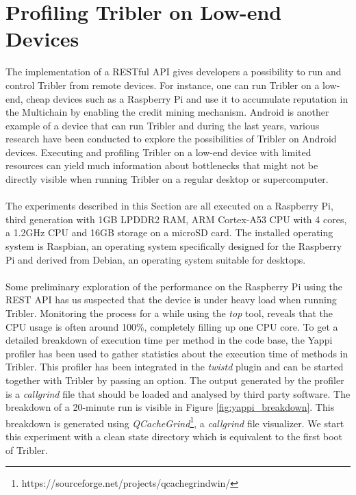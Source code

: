 \section{Profiling Tribler on Low-end Devices}
\label{sec:profiling_tribler_lowend}
The implementation of a RESTful API gives developers a possibility to run and control Tribler from remote devices. For instance, one can run Tribler on a low-end, cheap devices such as a Raspberry Pi and use it to accumulate reputation in the Multichain by enabling the credit mining mechanism. Android is another example of a device that can run Tribler and during the last years, various research have been conducted to explore the possibilities of Tribler on Android devices\cite{sabee2014tribler}\cite{de2014android}. Executing and profiling Tribler on a low-end device with limited resources can yield much information about bottlenecks that might not be directly visible when running Tribler on a regular desktop or supercomputer.\\\\
The experiments described in this Section are all executed on a Raspberry Pi, third generation with 1GB LPDDR2 RAM, ARM Cortex-A53 CPU with 4 cores, a 1.2GHz CPU and 16GB storage on a microSD card. The installed operating system is Raspbian, an operating system specifically designed for the Raspberry Pi and derived from Debian, an operating system suitable for desktops.\\\\
Some preliminary exploration of the performance on the Raspberry Pi using the REST API has us suspected that the device is under heavy load when running Tribler. Monitoring the process for a while using the \emph{top} tool, reveals that the CPU usage is often around 100\%, completely filling up one CPU core. To get a detailed breakdown of execution time per method in the code base, the Yappi profiler has been used to gather statistics about the execution time of methods in Tribler. This profiler has been integrated in the \emph{twistd} plugin and can be started together with Tribler by passing an option. The output generated by the profiler is a \emph{callgrind} file that should be loaded and analysed by third party software. The breakdown of a 20-minute run is visible in Figure \ref{fig:yappi_breakdown}. This breakdown is generated using \emph{QCacheGrind}\footnote{https://sourceforge.net/projects/qcachegrindwin/}, a \emph{callgrind} file visualizer. We start this experiment with a clean state directory which is equivalent to the first boot of Tribler.

